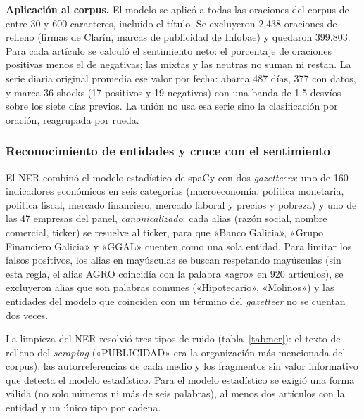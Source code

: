 \textbf{Aplicación al corpus.} El modelo se aplicó a todas las oraciones del corpus de entre 30
y 600 caracteres, incluido el título. Se excluyeron 2.438 oraciones de relleno (firmas de
Clarín, marcas de publicidad de Infobae) y quedaron 399.803. Para cada artículo se calculó el
sentimiento neto: el porcentaje de oraciones positivas menos el de negativas; las mixtas y las
neutras no suman ni restan. La serie diaria original promedia ese valor por fecha: abarca 487
días, 377 con datos, y marca 36 shocks (17 positivos y 19 negativos) con una banda de 1,5
desvíos sobre los siete días previos. La unión no usa esa serie sino la clasificación por
oración, reagrupada por rueda.

\subsubsection{Reconocimiento de entidades y cruce con el sentimiento}
\label{sec:ner-modelo}

El NER combinó el modelo estadístico de spaCy con dos \textit{gazetteers}: uno de 160
indicadores económicos en seis categorías (macroeconomía, política monetaria, política
fiscal, mercado financiero, mercado laboral y precios y pobreza) y uno de las 47 empresas del
panel, \textit{canonicalizado}: cada alias (razón social, nombre comercial, ticker) se resuelve
al ticker, para que «Banco Galicia», «Grupo Financiero Galicia» y «GGAL» cuenten como una sola
entidad. Para limitar los falsos positivos, los alias en mayúsculas se buscan respetando
mayúsculas (sin esta regla, el alias AGRO coincidía con la palabra «agro» en 920 artículos), se
excluyeron alias que son palabras comunes («Hipotecario», «Molinos») y las entidades del modelo
que coinciden con un término del \textit{gazetteer} no se cuentan dos veces.

La limpieza del NER resolvió tres tipos de ruido (tabla~\ref{tab:ner}): el texto de relleno del
\textit{scraping} («PUBLICIDAD» era la organización más mencionada del corpus), las
autorreferencias de cada medio y los fragmentos sin valor informativo que detecta el modelo
estadístico. Para el modelo estadístico se exigió una forma válida (no solo números ni más de
seis palabras), al menos dos artículos con la entidad y un único tipo por cadena.

